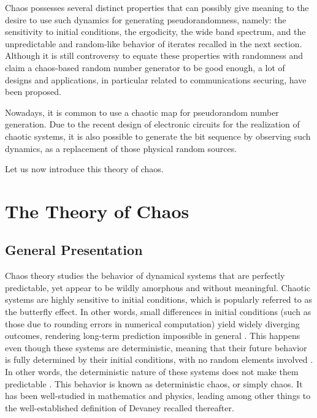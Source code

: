 Chaos possesses several distinct properties that can possibly give meaning to the desire to use such dynamics for generating pseudorandomness, namely: the sensitivity to initial conditions, the ergodicity, the wide band spectrum, and the unpredictable and random-like behavior of iterates recalled in the next section.
Although it is still controversy to equate these properties with randomness and claim a chaos-based random number generator to be good enough, a lot of designs and applications, in particular related to communications securing, have been proposed.

Nowadays, it is common to use a chaotic map for pseudorandom number generation. 
Due to the recent design of electronic circuits for the realization of chaotic 
systems, it is also possible to generate the bit sequence by observing such 
dynamics, as a replacement of those physical random sources.

Let us now introduce this theory of chaos.


\section{The Theory of Chaos}

\subsection{General Presentation}

Chaos theory studies the behavior of dynamical systems that are perfectly predictable, yet appear to be wildly amorphous and without meaningful. 
Chaotic systems are highly sensitive to initial conditions, 
which is popularly referred to as the butterfly effect. 
In other words, small differences in initial conditions (such as those due to rounding errors in numerical computation) yield widely diverging outcomes, 
rendering long-term prediction impossible in general \cite{kellert1994wake}. This happens even though these systems are deterministic, meaning that their future behavior is fully determined by their initial conditions, with no random elements involved \cite{kellert1994wake}. In other words, the deterministic nature of these systems does not make them predictable \cite{kellert1994wake,Werndl01032009}. This behavior is known as deterministic chaos, or simply chaos. It has been well-studied in mathematics and
physics, leading among other things to the well-established definition of Devaney
recalled thereafter.





